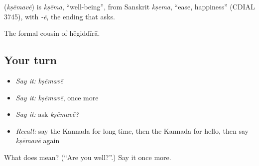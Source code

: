 \begin{cousinweb}
\textbf{} (\emph{kṣēmavē}) is \emph{kṣēma}, \textquotedblleft{}well-being\textquotedblright{}, from Sanskrit \emph{kṣema}, \textquotedblleft{}ease, happiness\textquotedblright{} (CDIAL 3745), with \emph{-ē}, the ending that asks.
\end{cousinweb}

\begin{grammarlens}[title={What you've built}]
The formal cousin of hēgiddīrā.
\end{grammarlens}

\subsection*{Your turn}
\begin{itemize}
\raggedright
  \item \emph{Say it:} \emph{kṣēmavē}
  \item \emph{Say it:} \emph{kṣēmavē}, once more
  \item \emph{Say it:} ask \emph{kṣēmavē?}
  \item \emph{Recall:} say the Kannada for long time, then the Kannada for hello, then say \emph{kṣēmavē} again
\end{itemize}

\begin{tcolorbox}[breakable,colback=teal!4,colframe=teal!35!black,title={Before you move on}]
What does  mean? (\textquotedblleft{}Are you well?\textquotedblright{}.) Say it once more.
\end{tcolorbox}
